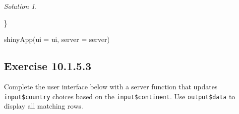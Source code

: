 \documentclass[
]{book}
\newenvironment{Shaded}{\begin{snugshade}}{\end{snugshade}}
\newcommand{\AttributeTok}[1]{\textcolor[rgb]{0.77,0.63,0.00}{#1}}
\newcommand{\ConstantTok}[1]{\textcolor[rgb]{0.00,0.00,0.00}{#1}}
\newcommand{\FunctionTok}[1]{\textcolor[rgb]{0.00,0.00,0.00}{#1}}
\newcommand{\NormalTok}[1]{#1}
\newcommand{\OtherTok}[1]{\textcolor[rgb]{0.56,0.35,0.01}{#1}}
\newcommand{\SpecialCharTok}[1]{\textcolor[rgb]{0.00,0.00,0.00}{#1}}
\newcommand{\StringTok}[1]{\textcolor[rgb]{0.31,0.60,0.02}{#1}}
\theoremstyle{definition}
\theoremstyle{definition}
\theoremstyle{definition}
\theoremstyle{definition}
\theoremstyle{remark}
\newtheorem*{solution}{Solution}
\begin{document}
\begin{solution}
\begin{Shaded}
\begin{Highlighting}[]
\NormalTok{\}}


\FunctionTok{shinyApp}\NormalTok{(}\AttributeTok{ui =}\NormalTok{ ui, }\AttributeTok{server =}\NormalTok{ server)}
\end{Highlighting}
\end{Shaded}

\end{solution}

\hypertarget{exercise-10.1.5.3}{%
\subsection*{Exercise 10.1.5.3}\label{exercise-10.1.5.3}}

Complete the user interface below with a server function that updates \texttt{input\$country} choices based on the \texttt{input\$continent}. Use \texttt{output\$data} to display all matching rows.

\begin{Shaded}
\end{Shaded}
\end{document}
